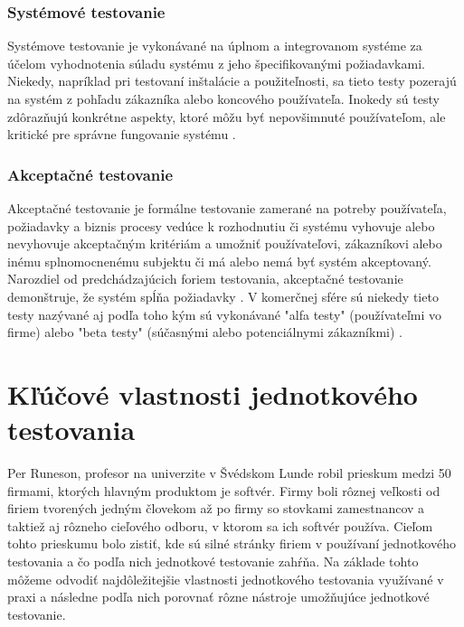 \documentclass[11pt,twoside,slovak,a4paper]{article}
\begin{document}
		\subsubsection{Systémové testovanie} 		
			Systémove testovanie je vykonávané na úplnom a integrovanom systéme za účelom vyhodnotenia súladu systému z jeho špecifikovanými požiadavkami\cite{Dictionary}. 
			Niekedy, napríklad pri testovaní inštalácie a použiteľnosti, sa tieto testy pozerajú na systém z pohľadu zákazníka alebo koncového používateľa. Inokedy sú testy zdôrazňujú konkrétne aspekty, ktoré môžu byť nepovšimnuté používateľom, ale kritické pre správne fungovanie systému \cite{Alba2008}.
	\subsubsection{Akceptačné testovanie}	
			Akceptačné testovanie je formálne testovanie zamerané na potreby používateľa, požiadavky a  biznis procesy vedúce k rozhodnutiu či systému vyhovuje alebo nevyhovuje akceptačným kritériám a umožniť používateľovi, zákazníkovi alebo inému splnomocnenému subjektu či má alebo nemá byť systém akceptovaný\cite{Veenendaal2010}. \newline
			Narozdiel od predchádzajúcich foriem testovania, akceptačné testovanie demonštruje, že systém spĺňa požiadavky \cite{Alba2008}. \newline
			V komerčnej sfére sú niekedy tieto testy nazývané aj podľa toho kým sú vykonávané "alfa testy" (používateľmi vo firme) alebo "beta testy" (súčasnými alebo potenciálnymi zákazníkmi) \cite{Alba2008}.
	
	\section{Kľúčové vlastnosti jednotkového testovania}
	
	Per Runeson, profesor na univerzite v Švédskom Lunde robil prieskum medzi 50 firmami, ktorých hlavným produktom je softvér\cite{Runeson2006}. Firmy boli rôznej veľkosti od firiem tvorených jedným človekom až po firmy so stovkami zamestnancov a taktiež aj rôzneho cieľového odboru, v ktorom sa ich softvér používa. Cieľom tohto prieskumu bolo zistiť, kde sú silné stránky firiem v používaní jednotkového testovania a čo podľa nich jednotkové testovanie zahŕňa. Na základe tohto môžeme odvodiť najdôležitejšie vlastnosti jednotkového testovania využívané v praxi a následne podľa nich porovnať rôzne nástroje umožňujúce jednotkové testovanie.
	
\end{document}
